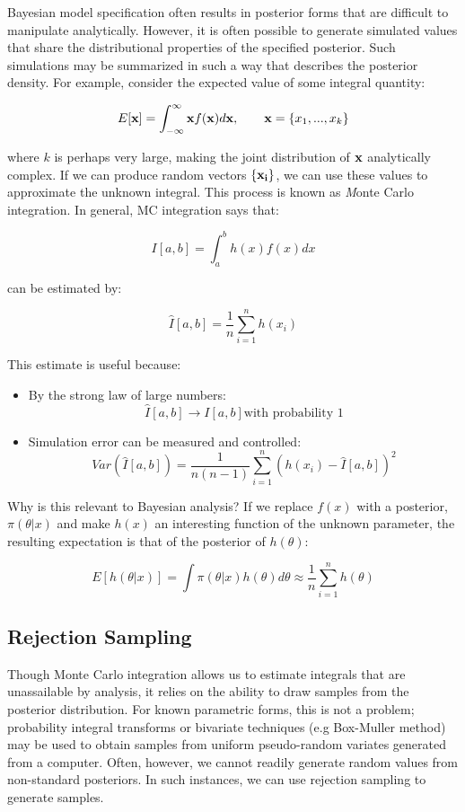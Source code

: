 \documentclass[]{book}
\begin{document}
Bayesian model specification often results in posterior forms that are difficult to manipulate analytically. However, it is often possible to generate simulated values that share the distributional properties of the specified posterior. Such simulations may be summarized in such a way that describes the posterior density. For example, consider the expected value of some integral quantity:

\[
E[{\bf x}] = \int_{-\infty}^{\infty} {\bf x} f({\bf x}) d{\bf x}, \qquad
{\bf x} = \{x_1,...,x_k\}
\]

\noindent where $k$ is perhaps very large, making the joint distribution of ${\bf x}$ analytically complex. If we can produce random vectors $\{{\bf x_i}\}$, we can use these values to approximate the unknown integral. This process is known as {\emph Monte Carlo integration}. In general, MC integration says that:

\[
I[a,b] = \int_a^b h(x) f(x) dx
\]

\noindent can be estimated by:

\[
\hat{I}[a,b] = \frac{1}{n}\sum_{i=1}^n h(x_i)
\]

\noindent This estimate is useful because:

\begin{itemize}
\item
By the strong law of large numbers:
\[\hat{I}[a,b] \rightarrow I[a,b] \mbox{with probability 1}\]
\item
Simulation error can be measured and controlled:
\[Var(\hat{I}[a,b]) = \frac{1}{n(n-1)}\sum_{i=1}^n (h(x_i)-\hat{I}[a,b])^2\]
\end{itemize}

Why is this relevant to Bayesian analysis? If we replace $f(x)$ with a posterior, $\pi(\theta|x)$ and make $h(x)$ an interesting function of the unknown parameter, the resulting expectation is that of the posterior of $h(\theta)$:

\[
E[h(\theta|x)] = \int \pi(\theta|x) h(\theta) d\theta \approx \frac{1}{n}\sum_{i=1}^n h(\theta)
\]

\subsection{Rejection Sampling}

Though Monte Carlo integration allows us to estimate integrals that are unassailable by analysis, it relies on the ability to draw samples from the posterior distribution. For known parametric forms, this is not a problem; probability integral transforms or bivariate techniques (e.g Box-Muller method) may be used to obtain samples from uniform pseudo-random variates generated from a computer. Often, however, we cannot readily generate random values from non-standard posteriors. In such instances, we can use rejection sampling to generate samples.
\end{document}
